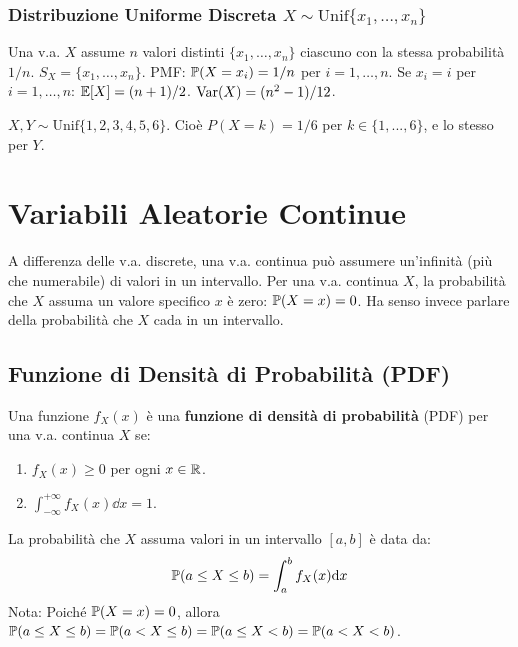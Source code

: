 \documentclass[12pt,a4paper]{article}
\begin{document}
\begin{example}
\subsection{Distribuzione Uniforme Discreta \texorpdfstring{$X \sim \text{Unif}\{x_1, \dots, x_n\}$}{X ~ Unif}}
Una v.a. $X$ assume $n$ valori distinti $\{x_1, \dots, x_n\}$ ciascuno con la stessa probabilità $1/n$.
$S_X = \{x_1, \dots, x_n\}$.
PMF: $\mathbb{P}(X=x_i) = 1/n$ per $i=1, \dots, n$.
Se $x_i = i$ per $i=1, \dots, n$:
$\mathbb{E}[X] = (n+1)/2$.
$\mathrm{Var}(X) = (n^2-1)/12$.
\begin{example}
$X, Y \sim \text{Unif}\{1, 2, 3, 4, 5, 6\}$. Cioè $P(X=k)=1/6$ per $k \in \{1, ..., 6\}$, e lo stesso per $Y$.
\end{example}

\chapter{Variabili Aleatorie Continue}
\label{cap:va_continue}
A differenza delle v.a. discrete, una v.a. continua può assumere un'infinità (più che numerabile) di valori in un intervallo. Per una v.a. continua $X$, la probabilità che $X$ assuma un valore specifico $x$ è zero: $\mathbb{P}(X=x)=0$. Ha senso invece parlare della probabilità che $X$ cada in un intervallo.

\section{Funzione di Densità di Probabilità (PDF)}
\begin{definition}
Una funzione $f_X(x)$ è una \textbf{funzione di densità di probabilità} (PDF) per una v.a. continua $X$ se:
\begin{enumerate}
    \item $f_X(x) \ge 0$ per ogni $x \in \mathbb{R}$.
    \item $\int_{-\infty}^{+\infty} f_X(x) \dd x = 1$.
\end{enumerate}
La probabilità che $X$ assuma valori in un intervallo $[a,b]$ è data da:
\[ \mathbb{P}(a \le X \le b) = \int_a^b f_X(x) \mathrm{d} x \]
Nota: Poiché $\mathbb{P}(X=x)=0$, allora $\mathbb{P}(a \le X \le b) = \mathbb{P}(a < X \le b) = \mathbb{P}(a \le X < b) = \mathbb{P}(a < X < b)$.
\end{definition}


\end{example}
\end{document}
